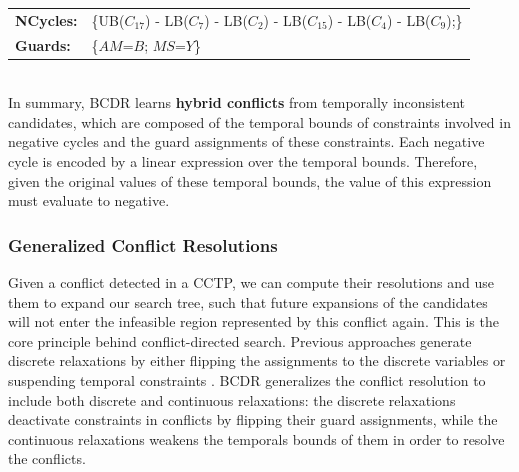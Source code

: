 \documentclass[jair,twoside,11pt,theapa]{article}
\begin{document}
\begin{tabular}{m{2.5cm} m{11cm}}
	\textbf{NCycles:} & \{\textsc{UB}($C_{17}$) - \textsc{LB}($C_{7}$) -
	\textsc{LB}($C_{2}$) - \textsc{LB}($C_{15}$) - \textsc{LB}($C_{4}$) -
	\textsc{LB}($C_{9}$);\}\\
	\textbf{Guards:} 	& \{$AM$=$B$; $MS$=$Y$\}\\
\end{tabular}\\

In summary, BCDR learns \textbf{hybrid conflicts} from temporally inconsistent
candidates, which are composed of the temporal bounds of constraints involved in negative
cycles and the guard assignments of these constraints. Each negative cycle is
encoded by a linear expression over the temporal bounds. Therefore, given the
original values of these temporal bounds, the value of this expression must
evaluate to negative.


\subsubsection{Generalized Conflict Resolutions}

Given a conflict detected in a CCTP, we can compute their resolutions and use
them to expand our search tree, such that future expansions of the candidates
will not enter the infeasible region represented by this conflict again. This is
the core principle behind conflict-directed search. Previous approaches generate
discrete relaxations by either flipping the assignments to the discrete
variables \cite{Williams_CDAstar_2002,Bailey_DAA_2005} or suspending temporal
constraints \cite{Moffitt_PCS_2005a}. BCDR generalizes the conflict resolution
to include both discrete and continuous relaxations: the discrete relaxations
deactivate constraints in conflicts by flipping their guard assignments, while
the continuous relaxations weakens the temporals bounds of them in order to
resolve the conflicts.
\end{document}
